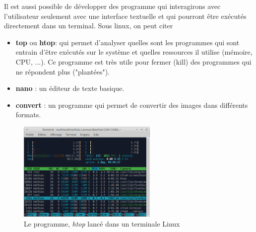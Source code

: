 Il est aussi possible de développer des programme qui interagirons avec l'utilisateur seulement avec une interface textuelle et qui pourront être exécutés directement dans un terminal. Sous linux, on peut citer
\begin{itemize}
	\item \textbf{top} ou \textbf{htop}: qui permet d'analyser quelles sont les programmes qui sont entrain d'être exécutés sur le système et quelles ressources il utilise (mémoire, CPU, ...).  Ce programme est très utile pour fermer (kill) des programmes qui ne répondent plus ("plantées").
	\item \textbf{nano} : un éditeur de texte basique.
	\item \textbf{convert} : un programme qui permet de convertir des images dans différents formats.
\end{itemize}
\begin{figure}[h!]
	\centering
	\includegraphics[trim=0 0 0 0,width=0.6\textwidth]{Images/OS/Exemple_terminal.png}
	\caption{Le programme, \textit{htop} lancé dans un terminale Linux}
\end{figure}
